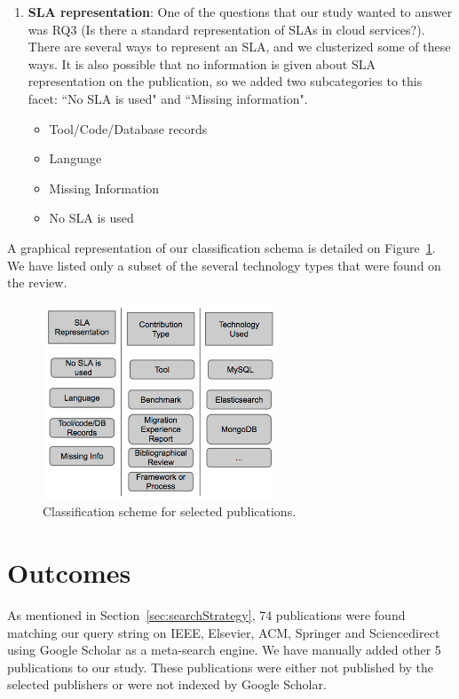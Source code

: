 \documentclass[a4paper]{IEEEtran}
\begin{document}
\begin{enumerate}
    \item \textbf{SLA representation}: One of the questions that our study wanted to answer was RQ3 (Is there a standard representation of SLAs in cloud services?). There are several ways to represent an SLA, and we clusterized some of these ways. It is also possible that no information is given about SLA representation on the publication, so we added two subcategories to this facet: ``No SLA is used" and ``Missing information".  
    \begin{itemize}
      \item Tool/Code/Database records
      \item Language
      \item Missing Information
      \item No SLA is used
    \end{itemize}  
\end{enumerate}

A graphical representation of our classification schema is detailed on Figure~\ref{fig:classificationSchema}. We have listed only a subset of the several technology types that were found on the review.

\begin{figure}
\centering
\includegraphics[width=70mm]{classificationSchema.png}
\caption{Classification scheme for selected publications. \label{fig:classificationSchema}}
\end{figure}

\section{Outcomes}
\label{sec:outcomes}

As mentioned in Section~\ref{sec:searchStrategy}, 74 publications were found matching our query string on IEEE, Elsevier, ACM, Springer and Sciencedirect using Google Scholar as a meta-search engine. We have manually added other 5 publications to our study. These publications were either not published by the selected publishers or were not indexed by Google Scholar. 
\end{document}
